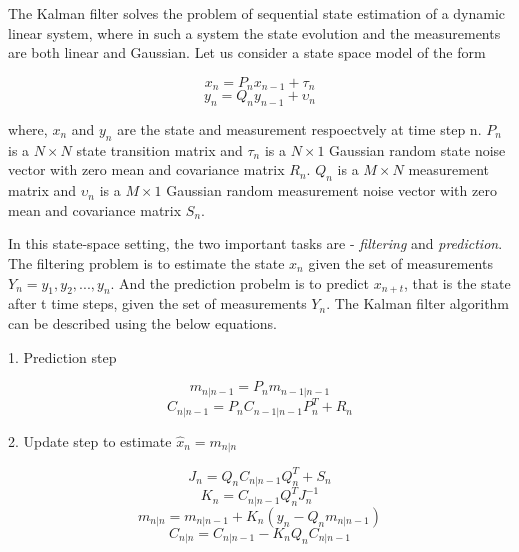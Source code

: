 The Kalman filter solves the problem of sequential state estimation of a dynamic linear system, where
in such a system the state evolution and the measurements are both linear and Gaussian. Let us consider
a state space model of the form

        \begin{equation} x_{n} = P_{n}x_{n-1} + \tau_{n} \end{equation}
        \begin{equation} y_{n} = Q_{n}y_{n-1} + \upsilon_{n} \end{equation}

where, $x_{n}$ and $y_{n}$ are the state and measurement respoectvely at time step n.
$P_{n}$ is a $N \times N$ state transition matrix and $\tau_{n}$ is a $N \times 1$ Gaussian
random state noise vector with zero mean and covariance matrix $R_{n}$. $Q_{n}$ is a $M \times N$
measurement matrix and $\upsilon_{n}$ is a $M \times 1$ Gaussian random measurement noise vector
with zero mean and covariance matrix $S_{n}$.

In this state-space setting, the two important tasks are - \textit{filtering} and \textit{prediction}.
The filtering problem is to estimate the state $x_{n}$ given the set of measurements
$Y_{n} = y_{1}, y_{2},...,y_{n}$. And the prediction probelm is to predict $x_{n+t}$, that is the
state after t time steps, given the set of measurements $Y_{n}$. The Kalman filter algorithm can be
described using the below equations.

        1. Prediction step

        \begin{equation} m_{n|n-1} = P_{n}m_{n-1|n-1} \end{equation}
        \begin{equation} C_{n|n-1} = P_{n}C_{n-1|n-1}P^{T}_{n} + R_{n} \end{equation}

        2. Update step to estimate $\hat{x}_{n} = m_{n|n}$

        \begin{equation} J_{n} = Q_{n}C_{n|n-1}Q^{T}_{n} + S_{n} \end{equation}
        \begin{equation} K_{n} = C_{n|n-1}Q^{T}_{n}J^{-1}_{n} \end{equation}
        \begin{equation} m_{n|n} = m_{n|n-1} + K_{n}(y_{n} - Q_{n}m_{n|n-1}) \end{equation}
        \begin{equation} C_{n|n} = C_{n|n-1} - K_{n}Q_{n}C_{n|n-1} \end{equation}

